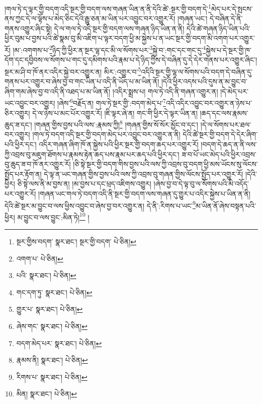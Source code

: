 །གལ་ཏེ་ད་ལྟར་གྱི་བདག་འདི་སྔར་གྱི་བདག་ལས་གཞན་ཡིན་ན་ནི་དེའི་ཚེ་:སྔར་གྱི་བདག་དེ་\footnote{སྔར་གྱིས་བདག་  སྣར་ཐང་། སྔར་གྱི་བདག་  པེ་ཅིན། }མེད་པར་དེ་སྤངས་ནས་ཀྱང་དེ་ལ་ལྟོས་པ་མེད་ཅིང་དེའི་རྒྱུ་ཅན་མ་ཡིན་པར་འབྱུང་བར་འགྱུར་རོ། །གཞན་ཡང་། དེ་བཞིན་དེ་ནི་གནས་འགྱུར་ཞིང་སྟེ། དེ་ལ་གལ་ཏེ་འདི་སྔར་གྱི་བདག་ལས་གཞན་ཉིད་ཡིན་ན་ནི། དེའི་ཚེ་གཞན་ཉིད་ཡིན་པའི་ཕྱིར་བུམ་པ་བྱས་པའི་ཚེ་སྣམ་བུ་མི་འཇིག་པ་ལྟར་བདག་ཕྱི་མ་སྐྱེས་པ་ན་ཡང་སྔར་གྱི་བདག་མི་འགག་པར་འགྱུར་རོ། །མ་:འགགས་པ་\footnote{འགག་པ་  པེ་ཅིན། }ཉིད་ཀྱི་ཕྱིར་ན་སྔར་ལྷ་དང་མི་ལ་སོགས་པར་\footnote{པའི་  སྣར་ཐང་།  པེ་ཅིན། }སྐྱེ་བ་:གང་དང་གང་དུ་\footnote{གང་དག་ཏུ་  སྣར་ཐང་།  པེ་ཅིན། }སྐྱེས་པ་དེ་སྔར་གྱི་ཁ་དོག་དང་དབྱིབས་ལ་སོགས་པ་གང་དུ་དམིགས་པའི་རྣམ་པ་དེ་ཉིད་ཀྱིས་དེ་བཞིན་དུ་དེ་དེར་གནས་པར་འགྱུར་ཞིང་། སྔར་མ་ཤི་བ་ཁོ་ནར་འདིར་སྐྱེ་བར་འགྱུར་ན། མིར་:འགྱུར་བ་\footnote{གྱུར་པ་  སྣར་ཐང་།  པེ་ཅིན། }འདིའི་སྔར་གྱི་ལྷ་ལ་སོགས་པའི་བདག་དེ་བཞིན་དུ་གནས་པར་འགྱུར་བ་ཞེས་བྱ་བ་གང་ཡིན་པ་འདི་ནི་ཡོད་པ་མ་ཡིན་ནོ། །དེའི་ཕྱིར་འདས་པའི་དུས་ན་མ་བྱུང་བ་ཞིག་གམ་ཞེས་བྱ་བ་འདི་ནི་འཐད་པ་མ་ཡིན་ནོ། །འདིར་སྨྲས་པ། གལ་ཏེ་འདི་ནི་གཞན་འགྱུར་ན། །དེ་མེད་པར་ཡང་འབྱུང་བར་འགྱུར། །ཞེས་\footnote{ཞེས་གང་  སྣར་ཐང་།  པེ་ཅིན། }བརྗོད་ན། གལ་ཏེ་སྔར་གྱི་:བདག་མེད་པ་\footnote{བདག་མེད་པར་  སྣར་ཐང་།  པེ་ཅིན། }འདི་འདིར་འབྱུང་བར་འགྱུར་ན་ཉེས་པ་ཅིར་འགྱུར། དེ་ལ་ཉེས་པ་མང་པོར་འགྱུར་རོ། །ཇི་ལྟར་ཞེ་ན། གང་གི་ཕྱིར་དེ་ལྟར་ཡིན་ན། །ཆད་དང་ལས་རྣམས་ཆུད་ཟ་དང་། །གཞན་གྱིས་བྱས་པའི་ལས་:རྣམས་ཀྱི།\footnote{རྣམས་ནི།  སྣར་ཐང་།  པེ་ཅིན། } །གཞན་གྱིས་སོ་སོར་མྱོང་བ་དང་། །དེ་ལ་སོགས་པར་ཐལ་བར་འགྱུར། །གལ་ཏེ་བདག་འདི་སྔར་གྱི་བདག་མེད་པར་འབྱུང་བར་འགྱུར་ན་ནི། དེའི་ཚེ་སྔར་གྱི་བདག་དེ་དེར་ཞིག་པའི་ཕྱིར་དང་། འདིར་གཞན་ཞིག་ཁོ་ན་སྐྱེས་པའི་ཕྱིར་སྔར་གྱི་བདག་ཆད་པར་འགྱུར་རོ། །བདག་དེ་ཆད་ན་ནི་ལས་ཀྱི་འབྲས་བུ་མཇུག་ཐོགས་པ་རྣམས་རྟེན་ཆད་པས་རྣམ་པར་ཆད་པའི་ཕྱིར་དང་། ཟ་བ་པོ་ཡང་མེད་པའི་ཕྱིར་འབྲས་བུ་ཆུད་ཟ་བ་ཁོ་ནར་འགྱུར་རོ། །ཅི་སྟེ་སྔར་གྱི་བདག་གིས་བྱས་པའི་ལས་ཀྱི་འབྲས་བུ་བདག་ཕྱི་མས་ཡོངས་སུ་ལོངས་སྤྱོད་པར་རྟོག་ན། དེ་ལྟ་ན་ཡང་གཞན་གྱིས་བྱས་པའི་ལས་ཀྱི་འབྲས་བུ་གཞན་གྱིས་ལོངས་སྤྱོད་པར་འགྱུར་རོ། །དེའི་ཕྱིར། ཅི་སྟེ་ལས་ནི་མ་བྱས་ན། །མ་བྱས་པ་དང་ཕྲད་འཇིགས་འགྱུར། །ཞེས་བྱ་བ་དེ་ལྟ་བུ་ལ་སོགས་པའི་མི་འདོད་པར་འགྱུར་རོ། །གཞན་ཡང་གལ་ཏེ་བདག་འདི་ནི་སྔར་གྱི་བདག་ལས་གཞན་དུ་གྱུར་པ་འདིར་སྐྱེས་པ་ཡིན་ན་ནི། དེའི་ཚེ་སྔར་མ་བྱུང་བ་ལས་ཕྱིས་འབྱུང་བ་ཞེས་བྱ་བར་འགྱུར་ན། དེ་ནི་:རིགས་པ་ཡང་\footnote{རིགས་པ་  སྣར་ཐང་།  པེ་ཅིན། }མ་ཡིན་ནོ་ཞེས་བསྟན་པའི་ཕྱིར། མ་བྱུང་བ་ལས་བྱུང་:མིན་ཏེ།\footnote{མིན།  སྣར་ཐང་།  པེ་ཅིན། } །
